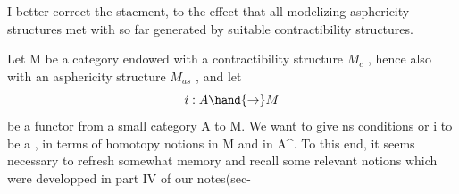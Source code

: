
I better correct the staement, to the effect that  all modelizing \hand{\uline{\textcolor{black}{totally}}}
\hand{\uline{\textcolor{black}{aspheric}}} asphericity structures met with so far   generated by
suitable contractibility structures.

Let M be a category endowed with a contractibility structure $M_c$ ,
hence also with an asphericity structure $M_{as}$ , and let 
 
\[ i : A \hand{\to} M \]
be a functor from a small category A to M. We want to give ns conditions
or i to be a \hand{\uline{\textcolor{black}{test}}} \hand{\uline{\textcolor{black}{functor}}}, in terms of homotopy notions in M and in A\^{}.
To this end, it seems necessary to refresh \hand{(}somewhat memory\hand{)}
 and recall
some relevant notions which were developped in part IV of our notes(sec-%
\hand{\uline{\textcolor{black}{tions 54 and 55).}}}

